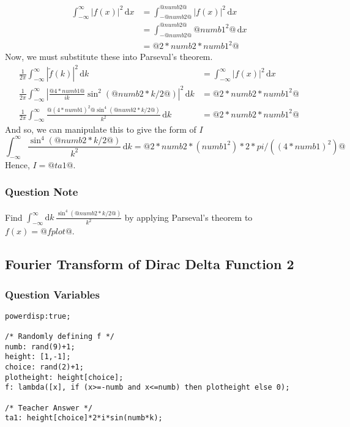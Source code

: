 \documentclass[a4paper,10pt]{article}
\begin{document}
\begin{align*} \int_{-\infty}^{\infty} |f(x)|^2 \, \text{d}x &= \int_{-@numb2@}^{@numb2@} |f(x)|^2 \, \text{d}x \\ &= \int_{-@numb2@}^{@numb2@} @numb1^2@ \, \text{d}x \\ &= @2*numb2*numb1^2@ \end{align*} Now, we must substitute these into Parseval's theorem. \begin{align*} \frac{1}{2\pi}\int_{-\infty}^{\infty} |\tilde{f}(k)|^2 \, \text{d}k &= \int_{-\infty}^{\infty} |f(x)|^2 \, \text{d}x \\ \frac{1}{2\pi}\int_{-\infty}^{\infty} \left|\frac{@4*numb1@}{ik} \sin^2\left(@numb2*k/2@\right) \right|^2 \, \text{d}k &= @2*numb2*numb1^2@ \\ \frac{1}{2\pi}\int_{-\infty}^{\infty} \frac{@(4*numb1)^2@\sin^4(@numb2*k/2@)}{k^2} \, \text{d}k &= @2*numb2*numb1^2@ \end{align*} And so, we can manipulate this to give the form of \(I\) \[ \int_{-\infty}^{\infty} \frac{\sin^4(@numb2*k/2@)}{k^2} \, \text{d}k = @2*numb2*(numb1^2)*2*pi/((4*numb1)^2)@ \] Hence, \(I = @ta1@\).
\subsubsection{Question Note}
Find \(\int_{-\infty}^{\infty}\text{d}k \, \frac{\sin^4(@numb2*k/2@)}{k^2}\) by applying Parseval's theorem to \(f(x) = @fplot@\).

\subsection{Fourier Transform of Dirac Delta Function 2}
\subsubsection{Question Variables}
\begin{lstlisting}
powerdisp:true;

/* Randomly defining f */
numb: rand(9)+1;
height: [1,-1];
choice: rand(2)+1;
plotheight: height[choice];
f: lambda([x], if (x>=-numb and x<=numb) then plotheight else 0);

/* Teacher Answer */
ta1: height[choice]*2*i*sin(numb*k);
\end{lstlisting}
\end{document}
